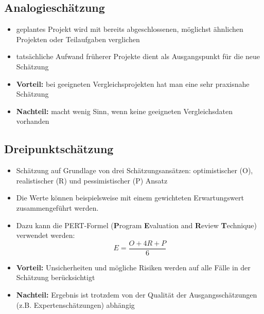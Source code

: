 \documentclass[a4paper,10pt]{article}
\begin{document}
        \subsection*{Analogieschätzung}
        \begin{itemize}
            \item geplantes Projekt wird mit bereits abgeschlossenen, möglichst ähnlichen Projekten oder Teilaufgaben verglichen
            \item tatsächliche Aufwand früherer Projekte dient als Ausgangspunkt für die neue Schätzung
            \item \textbf{Vorteil:} bei geeigneten Vergleichsprojekten hat man eine sehr praxisnahe Schätzung
            \item \textbf{Nachteil:} macht wenig Sinn, wenn keine geeigneten Vergleichsdaten vorhanden
        \end{itemize}

        \subsection*{Dreipunktschätzung}
        \begin{itemize}
            \item Schätzung auf Grundlage von drei Schätzungsansätzen: optimistischer (O), realistischer (R) und pessimistischer (P) Ansatz
            \item Die Werte können beispielsweise mit einem gewichteten Erwartungswert zusammengeführt werden.
            \item Dazu kann die PERT-Formel (\textbf{P}rogram \textbf{E}valuation and \textbf{R}eview \textbf{T}echnique) verwendet werden: \[ E = \frac{O+4R+P}{6}\]
            \item \textbf{Vorteil:} Unsicherheiten und mögliche Risiken werden auf alle Fälle in der Schätzung berücksichtigt
            \item \textbf{Nachteil:} Ergebnis ist trotzdem von der Qualität der Ausgangsschätzungen (z.B. Expertenschätzungen) abhängig
        \end{itemize}
\end{document}
